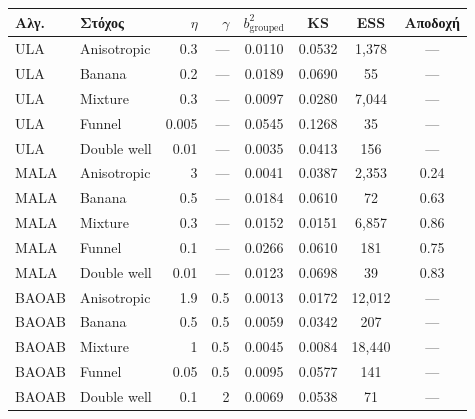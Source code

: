 \begin{tabular}{llrrcccc}
\toprule
Αλγ. & Στόχος & $\eta$ & $\gamma$ & $b^2_{\mathrm{grouped}}$ & KS & ESS & Αποδοχή \\
\midrule
ULA & Anisotropic & 0.3 & --- & 0.0110 & 0.0532 & 1,378 & --- \\
ULA & Banana & 0.2 & --- & 0.0189 & 0.0690 & 55 & --- \\
ULA & Mixture & 0.3 & --- & 0.0097 & 0.0280 & 7,044 & --- \\
ULA & Funnel & 0.005 & --- & 0.0545 & 0.1268 & 35 & --- \\
ULA & Double well & 0.01 & --- & 0.0035 & 0.0413 & 156 & --- \\
\midrule
MALA & Anisotropic & 3 & --- & 0.0041 & 0.0387 & 2,353 & 0.24 \\
MALA & Banana & 0.5 & --- & 0.0184 & 0.0610 & 72 & 0.63 \\
MALA & Mixture & 0.3 & --- & 0.0152 & 0.0151 & 6,857 & 0.86 \\
MALA & Funnel & 0.1 & --- & 0.0266 & 0.0610 & 181 & 0.75 \\
MALA & Double well & 0.01 & --- & 0.0123 & 0.0698 & 39 & 0.83 \\
\midrule
BAOAB & Anisotropic & 1.9 & 0.5 & 0.0013 & 0.0172 & 12,012 & --- \\
BAOAB & Banana & 0.5 & 0.5 & 0.0059 & 0.0342 & 207 & --- \\
BAOAB & Mixture & 1 & 0.5 & 0.0045 & 0.0084 & 18,440 & --- \\
BAOAB & Funnel & 0.05 & 0.5 & 0.0095 & 0.0577 & 141 & --- \\
BAOAB & Double well & 0.1 & 2 & 0.0069 & 0.0538 & 71 & --- \\
\bottomrule
\end{tabular}

